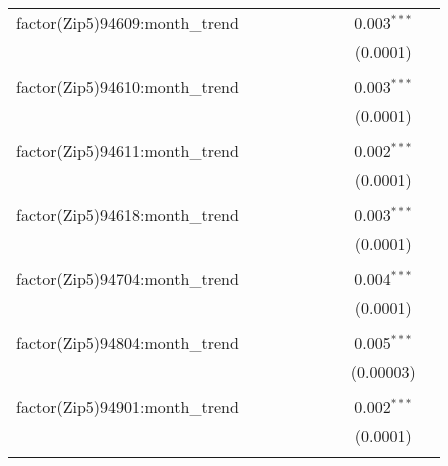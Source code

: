 \begin{table}[H]
{\begin{tabular}{@{\extracolsep{5pt}}lcccccccc}
  factor(Zip5)94609:month\_trend &  &  &  &  &  &  & 0.003$^{***}$ &  \\  

   &  &  &  &  &  &  & (0.0001) &  \\  

   & & & & & & & & \\  

  factor(Zip5)94610:month\_trend &  &  &  &  &  &  & 0.003$^{***}$ &  \\  

   &  &  &  &  &  &  & (0.0001) &  \\  

   & & & & & & & & \\  

  factor(Zip5)94611:month\_trend &  &  &  &  &  &  & 0.002$^{***}$ &  \\  

   &  &  &  &  &  &  & (0.0001) &  \\  

   & & & & & & & & \\  

  factor(Zip5)94618:month\_trend &  &  &  &  &  &  & 0.003$^{***}$ &  \\  

   &  &  &  &  &  &  & (0.0001) &  \\  

   & & & & & & & & \\  

  factor(Zip5)94704:month\_trend &  &  &  &  &  &  & 0.004$^{***}$ &  \\  

   &  &  &  &  &  &  & (0.0001) &  \\  

   & & & & & & & & \\  

  factor(Zip5)94804:month\_trend &  &  &  &  &  &  & 0.005$^{***}$ &  \\  

   &  &  &  &  &  &  & (0.00003) &  \\  

   & & & & & & & & \\  

  factor(Zip5)94901:month\_trend &  &  &  &  &  &  & 0.002$^{***}$ &  \\  

   &  &  &  &  &  &  & (0.0001) &  \\  

   & & & & & & & & \\  


\end{tabular}}
\end{table}
